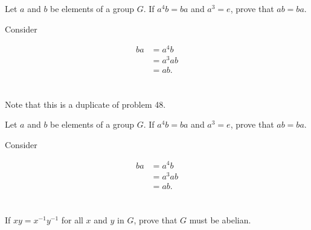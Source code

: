 \documentclass[a4paper]{article}
\begin{document}
Let $a$ and $b$ be elements of a group $G$. If $a^4b = ba$ and $a^3 = e$, prove that $ab = ba$.

\vspace{\baselineskip}

Consider

\begin{align*}
ba &= a^4b \\
&= a^3 ab \\
&= ab.
\end{align*}


\section{}

Note that this is a duplicate of problem 48.

Let $a$ and $b$ be elements of a group $G$. If $a^4b = ba$ and $a^3 = e$, prove that $ab = ba$.
\vspace{\baselineskip}

Consider

\begin{align*}
ba &= a^4b \\
&= a^3 ab \\
&= ab.
\end{align*}


\section{}


\section{}

If $xy = x^{-1} y^{-1}$ for all $x$ and $y$ in $G$, prove that $G$ must be abelian.

\vspace{\baselineskip}
\end{document}
